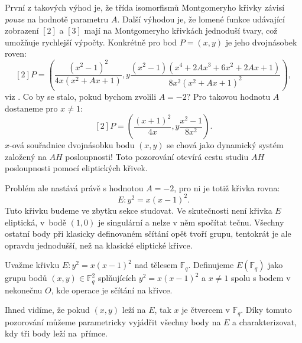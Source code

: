 \documentclass[12pt]{report}
\begin{document}
První z takových výhod je, že třída isomorfismů Montgomeryho křivky závisí \textit{pouze} na hodnotě parametru $A$. Další výhodou je, že lomené funkce udávající zobrazení $[2]$ a $[3]$ mají na Montgomeryho křivkách jednoduší tvary, což umožňuje rychlejší výpočty. Konkrétně pro bod $P = (x,y)$ je jeho dvojnásobek roven:
$$[2] P = \left(\frac{(x^2-1)^2}{4x(x^2+Ax+1)},y \frac{(x^2-1)(x^4+2 A x^3 + 6x^2 + 2 Ax + 1)}{8 x^2 (x^2+Ax+1)^2} \right),$$
viz \cite{Karaskova}. Co by se stalo, pokud bychom zvolili $A = -2$? Pro takovou hodnotu $A$ dostaneme pro $x \neq 1$:
\begin{equation}\label{dvoj}
[2] P = \left(\frac{(x+1)^2}{4x},y \frac{x^2-1}{8 x^2} \right).
\end{equation}
$x$-ová souřadnice dvojnásobku bodu $(x,y)$ se chová jako dynamický systém založený na $AH$ posloupnosti! Toto pozorování otevírá cestu studiu $AH$ posloupnosti pomocí eliptických křivek.

Problém ale nastává právě s hodnotou $A=-2$, pro ni je totiž křivka rovna: $$E: y^2 = x(x-1)^2.$$ Tuto křivku budeme ve zbytku sekce studovat. Ve skutečnosti není křivka $E$ eliptická, v~bodě $(1,0)$ je singulární a nelze v něm spočítat tečnu. Všechny ostatní body při klasicky definovaném sčítání opět tvoří grupu, tentokrát je ale opravdu jednodušší, než na klasické eliptické křivce. 

\begin{definice}
Uvažme křivku $E : y^2 = x(x-1)^2$ nad tělesem $\mathbb{F}_q$. Definujeme $E(\mathbb{F}_q)$ jako grupu bodů $(x,y) \in \mathbb{F}_q ^2$ splňujících $y^2 = x(x-1)^2$ a $x \neq 1$ spolu s bodem v nekonečnu $O$, kde operace je sčítání na křivce.  
\end{definice}

Ihned vidíme, že pokud $(x,y)$ leží na $E$, tak $x$ je čtvercem v $\mathbb{F}_q$. Díky tomuto pozorování můžeme parametricky vyjádřit všechny body na $E$ a charakterizovat, kdy tři body leží na~přímce.
\end{document}
